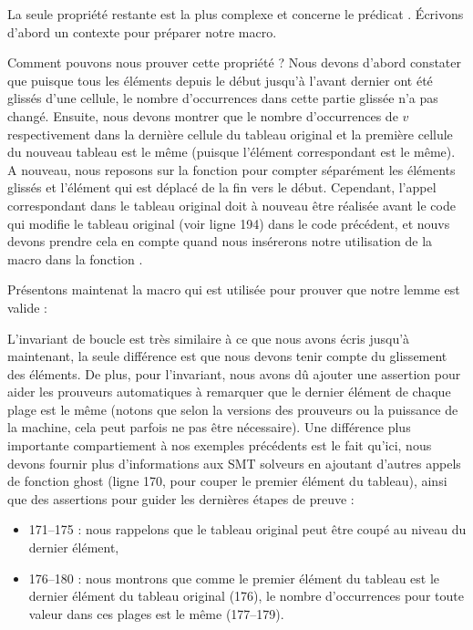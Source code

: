 

La seule propriété restante est la plus complexe et concerne le prédicat
. Écrivons d'abord un contexte pour préparer notre
macro.




Comment pouvons nous prouver cette propriété ? Nous devons d'abord constater
que puisque tous les éléments depuis le début jusqu'à l'avant dernier ont été
glissés d'une cellule, le nombre d'occurrences dans cette partie glissée n'a
pas changé. Ensuite, nous devons montrer que le nombre d'occurrences de $v$
respectivement dans la dernière cellule du tableau original et la première 
cellule du nouveau tableau est le même (puisque l'élément correspondant est le
même). A nouveau, nous reposons sur la fonction  pour compter
séparément les éléments glissés et l'élément qui est déplacé de la fin vers le
début. Cependant, l'appel correspondant dans le tableau original doit à nouveau
être réalisée avant le code qui modifie le tableau original (voir ligne 194) dans
le code précédent, et nouvs devons prendre cela en compte quand nous insérerons
notre utilisation de la macro dans la fonction .


Présentons maintenat la macro qui est utilisée pour prouver que notre lemme
est valide :




L'invariant de boucle est très similaire à ce que nous avons écris jusqu'à
maintenant, la seule différence est que nous devons tenir compte du glissement
des éléments. De plus, pour l'invariant, nous avons dû ajouter une assertion 
pour aider les prouveurs automatiques à remarquer que le dernier élément de
chaque plage est le même (notons que selon la versions des prouveurs ou la
puissance de la machine, cela peut parfois ne pas être nécessaire). Une différence
plus importante compartiement à nos exemples précédents est le fait qu'ici, nous
devons fournir plus d'informations aux SMT solveurs en ajoutant d'autres appels
de fonction ghost (ligne 170, pour couper le premier élément du tableau), ainsi
que des assertions pour guider les dernières étapes de preuve :


\begin{itemize}
    \item 171--175 : nous rappelons que le tableau original peut être coupé au
          niveau du dernier élément,
    \item 176--180 : nous montrons que comme le premier élément du tableau est le 
          dernier élément du tableau original (176), le nombre d'occurrences pour
          toute valeur dans ces plages est le même (177--179).
\end{itemize}



